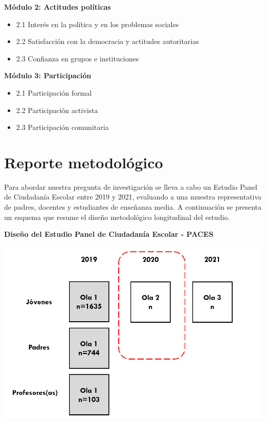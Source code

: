 \documentclass[
  14pt,
]{book}
\providecommand{\tightlist}{%
  \setlength{\itemsep}{0pt}\setlength{\parskip}{0pt}}
\begin{document}
\textbf{Módulo 2: Actitudes políticas}

\begin{itemize}
\tightlist
\item
  2.1 Interés en la política y en los problemas sociales
\item
  2.2 Satisfacción con la democracia y actitudes autoritarias
\item
  2.3 Confianza en grupos e instituciones
\end{itemize}

\textbf{Módulo 3: Participación}

\begin{itemize}
\tightlist
\item
  2.1 Participación formal
\item
  2.2 Participación activista
\item
  2.3 Participación comunitaria
\end{itemize}

\hypertarget{reporte-metodoluxf3gico}{%
\chapter*{Reporte metodológico}\label{reporte-metodoluxf3gico}}

Para abordar nuestra pregunta de investigación se lleva a cabo un Estudio Panel de Ciudadanía Escolar entre 2019 y 2021, evaluando a una muestra representativa de padres, docentes y estudiantes de enseñanza media. A continuación se presenta un esquema que resume el diseño metodológico longitudinal del estudio.

\textbf{Diseño del Estudio Panel de Ciudadanía Escolar - PACES}

\begin{center}\includegraphics[width=0.8\linewidth,]{images/diseno1} \end{center}
\end{document}
